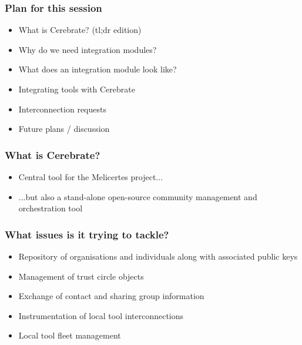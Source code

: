 
\begin{frame}[t,plain]
\titlepage
\end{frame}

\begin{frame}
	\frametitle{Plan for this session}
	\begin{itemize}
		\item What is Cerebrate? (tl;dr edition)
                \item Why do we need integration modules?
                \item What does an integration module look like?
		\item Integrating tools with Cerebrate
                \item Interconnection requests
                \item Future plans / discussion
	\end{itemize}
\end{frame}

\begin{frame}
	\frametitle{What is Cerebrate?}
	\begin{itemize}
                \item Central tool for the Melicertes project...
                \item ...but also a stand-alone open-source community management and orchestration tool
	\end{itemize}
\end{frame}

\begin{frame}
	\frametitle{What issues is it trying to tackle?}
	\begin{itemize}
                \item Repository of organisations and individuals along with associated public keys
                \item Management of trust circle objects
                \item Exchange of contact and sharing group information
                \item Instrumentation of local tool interconnections
                \item Local tool fleet management
	\end{itemize}
\end{frame}

